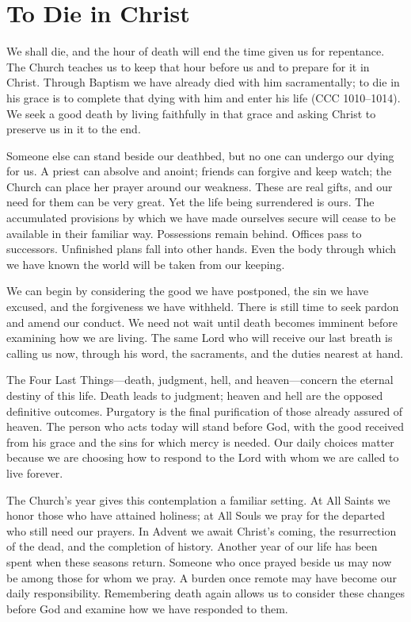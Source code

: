 \section{To Die in Christ}

We shall die, and the hour of death will end the time given us for repentance. The Church teaches us to keep that hour before us and to prepare for it in Christ. Through Baptism we have already died with him sacramentally; to die in his grace is to complete that dying with him and enter his life (CCC 1010--1014). We seek a good death by living faithfully in that grace and asking Christ to preserve us in it to the end.

Someone else can stand beside our deathbed, but no one can undergo our dying for us. A priest can absolve and anoint; friends can forgive and keep watch; the Church can place her prayer around our weakness. These are real gifts, and our need for them can be very great. Yet the life being surrendered is ours. The accumulated provisions by which we have made ourselves secure will cease to be available in their familiar way. Possessions remain behind. Offices pass to successors. Unfinished plans fall into other hands. Even the body through which we have known the world will be taken from our keeping.

We can begin by considering the good we have postponed, the sin we have excused, and the forgiveness we have withheld. There is still time to seek pardon and amend our conduct. We need not wait until death becomes imminent before examining how we are living. The same Lord who will receive our last breath is calling us now, through his word, the sacraments, and the duties nearest at hand.

The Four Last Things---death, judgment, hell, and heaven---concern the eternal destiny of this life. Death leads to judgment; heaven and hell are the opposed definitive outcomes. Purgatory is the final purification of those already assured of heaven. The person who acts today will stand before God, with the good received from his grace and the sins for which mercy is needed. Our daily choices matter because we are choosing how to respond to the Lord with whom we are called to live forever.

The Church's year gives this contemplation a familiar setting. At All Saints we honor those who have attained holiness; at All Souls we pray for the departed who still need our prayers. In Advent we await Christ's coming, the resurrection of the dead, and the completion of history. Another year of our life has been spent when these seasons return. Someone who once prayed beside us may now be among those for whom we pray. A burden once remote may have become our daily responsibility. Remembering death again allows us to consider these changes before God and examine how we have responded to them.

